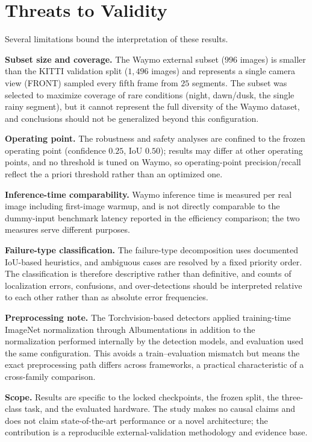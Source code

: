 \section{Threats to Validity}
\label{sec:threats}

Several limitations bound the interpretation of these results.

\textbf{Subset size and coverage.} The Waymo external subset ($996$ images) is smaller than
the KITTI validation split ($1{,}496$ images) and represents a single camera view (FRONT)
sampled every fifth frame from $25$ segments. The subset was selected to maximize coverage
of rare conditions (night, dawn/dusk, the single rainy segment), but it cannot represent
the full diversity of the Waymo dataset, and conclusions should not be generalized beyond
this configuration.

\textbf{Operating point.} The robustness and safety analyses are confined to the frozen
operating point (confidence $0.25$, IoU $0.50$); results may differ at other operating
points, and no threshold is tuned on Waymo, so operating-point precision/recall reflect the
a priori threshold rather than an optimized one.

\textbf{Inference-time comparability.} Waymo inference time is measured per real image
including first-image warmup, and is not directly comparable to the dummy-input benchmark
latency reported in the efficiency comparison; the two measures serve different purposes.

\textbf{Failure-type classification.} The failure-type decomposition uses documented
IoU-based heuristics, and ambiguous cases are resolved by a fixed priority order. The
classification is therefore descriptive rather than definitive, and counts of localization
errors, confusions, and over-detections should be interpreted relative to each other rather
than as absolute error frequencies.

\textbf{Preprocessing note.} The Torchvision-based detectors applied training-time ImageNet
normalization through Albumentations in addition to the normalization performed internally
by the detection models, and evaluation used the same configuration. This avoids a
train--evaluation mismatch but means the exact preprocessing path differs across
frameworks, a practical characteristic of a cross-family comparison.

\textbf{Scope.} Results are specific to the locked checkpoints, the frozen split, the
three-class task, and the evaluated hardware. The study makes no causal claims and does not
claim state-of-the-art performance or a novel architecture; the contribution is a
reproducible external-validation methodology and evidence base.
